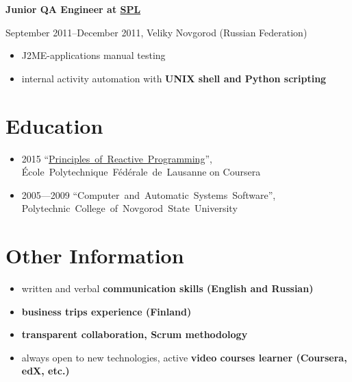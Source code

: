 \vspace{0.5cm}

{
\fontsize{12pt}{12pt}\selectfont
\bfseries Junior QA Engineer at
\href{http://spl.co}{\bfseries SPL\mdseries}
\mdseries
}

{
\fontsize{9pt}{8pt}\selectfont
September 2011--December 2011, Veliky Novgorod (Russian Federation)
}

\begin{itemize}[rightmargin=\dimexpr\linewidth-17cm-\leftmargin\relax]
    \setlength{\itemindent}{20pt}
    \item J2ME-applications manual testing
    \item internal activity automation with
\bfseries UNIX shell \mdseries and \bfseries Python \mdseries scripting
\end{itemize}

\section*{Education}
\begin{itemize}
    \item 2015 ``\href{https://www.coursera.org/account/accomplishments/verify/UJJ99REEZY}{Principles~of~Reactive~Programming}'', École~Polytechnique~Fédérale~de~Lausanne on Coursera
    \item 2005---2009 ``Computer~and~Automatic~Systems~Software'', Polytechnic~College~of~Novgorod~State~University
\end{itemize}

\section*{Other Information}
\begin{itemize}
    \item written and verbal \bfseries communication skills \mdseries (English and Russian)
    \item \bfseries business trips \mdseries experience (Finland)
    \item \bfseries transparent \mdseries collaboration, \bfseries Scrum \mdseries methodology
    \item always open to new technologies, active \bfseries video courses \mdseries learner (Coursera, edX, etc.)
\end{itemize}

